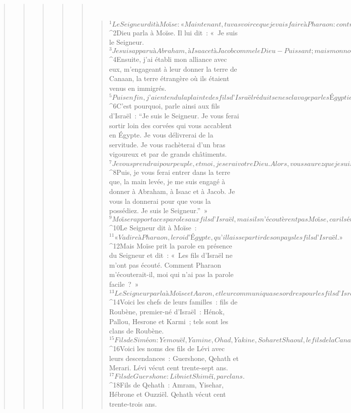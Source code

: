 \begin{verse}
\begin{verse}
\begin{verse}
\begin{verse}
\begin{verse}
         
      \bchapter{}
      \begin{verse}
${}^{1}Le Seigneur dit à Moïse :
      « Maintenant, tu vas voir ce que je vais faire à Pharaon : contraint par une main forte, il les laissera partir ; contraint par une main forte, il les chassera de son pays. »
${}^{2}Dieu parla à Moïse. Il lui dit : « Je suis le Seigneur. 
${}^{3}Je suis apparu à Abraham, à Isaac et à Jacob comme le Dieu-Puissant ; mais mon nom “Le Seigneur”, je ne l’ai pas fait connaître. 
${}^{4}Ensuite, j’ai établi mon alliance avec eux, m’engageant à leur donner la terre de Canaan, la terre étrangère où ils étaient venus en immigrés. 
${}^{5}Puis enfin, j’ai entendu la plainte des fils d’Israël réduits en esclavage par les Égyptiens, et je me suis souvenu de mon alliance. 
${}^{6}C’est pourquoi, parle ainsi aux fils d’Israël : “Je suis le Seigneur. Je vous ferai sortir loin des corvées qui vous accablent en Égypte. Je vous délivrerai de la servitude. Je vous rachèterai d’un bras vigoureux et par de grands châtiments. 
${}^{7}Je vous prendrai pour peuple, et moi, je serai votre Dieu. Alors, vous saurez que je suis le Seigneur, votre Dieu, celui qui vous fait sortir loin des corvées qui vous accablent en Égypte. 
${}^{8}Puis, je vous ferai entrer dans la terre que, la main levée, je me suis engagé à donner à Abraham, à Isaac et à Jacob. Je vous la donnerai pour que vous la possédiez. Je suis le Seigneur.” »
${}^{9}Moïse rapporta ces paroles aux fils d’Israël, mais ils n’écoutèrent pas Moïse, car ils étaient à bout de souffle, tant leur esclavage était dur.
${}^{10}Le Seigneur dit à Moïse : 
${}^{11}« Va dire à Pharaon, le roi d’Égypte, qu’il laisse partir de son pays les fils d’Israël. » 
${}^{12}Mais Moïse prit la parole en présence du Seigneur et dit : « Les fils d’Israël ne m’ont pas écouté. Comment Pharaon m’écouterait-il, moi qui n’ai pas la parole facile ? »
${}^{13}Le Seigneur parla à Moïse et Aaron, et leur communiqua ses ordres pour les fils d’Israël et pour Pharaon, roi d’Égypte, en vue de faire sortir les fils d’Israël du pays d’Égypte.
${}^{14}Voici les chefs de leurs familles : fils de Roubène, premier-né d’Israël : Hénok, Pallou, Hesrone et Karmi ; tels sont les clans de Roubène.
${}^{15}Fils de Siméon : Yemouël, Yamine, Ohad, Yakine, Sohar et Shaoul, le fils de la Cananéenne ; tels sont les clans de Siméon.
${}^{16}Voici les noms des fils de Lévi avec leurs descendances : Guershone, Qehath et Merari. Lévi vécut cent trente-sept ans.
${}^{17}Fils de Guershone : Libni et Shiméï, par clans.
${}^{18}Fils de Qehath : Amram, Yisehar, Hébrone et Ouzziël. Qehath vécut cent trente-trois ans.

\end{verse}
\end{verse}
\end{verse}
\end{verse}
\end{verse}
\end{verse}
